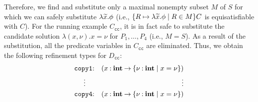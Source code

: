 Therefore, we find and substitute only a maximal nonempty subset \(M\) 
of \(S\) for which we can safely substitute \(\lambda\widetilde{x}.\phi\) (i.e., 
\(\{{R \mapsto \lambda\widetilde{x}.\phi \mid R \in M}\}C\) is equisatisfiable 
with \(C\)).
%
%
For the running example \(C_{\texttt{cc}}\), it is in fact safe to 
substitute the candidate solution \(\lambda (x,\nu). x=\nu\) for 
\(P_1,\dots,P_4\) (i.e., \(M=S\)).  As a result of the substitution, all 
the predicate variables in \(C_{\texttt{cc}}\) are eliminated.  Thus, we 
obtain the following refinement types for \(D_{\texttt{cc}}\):
\begin{eqnarray*}
\texttt{copy1}&\mathbin{:}&(x\mathbin{:}{\mathbf{int}}\mathbin{\rightarrow}{\{{\nu\mathbin{:}\mathbf{int} \mid x=\nu}\}}) \\
\vdots\quad &&\qquad\qquad \vdots \\
\texttt{copy4}&\mathbin{:}&(x\mathbin{:}{\mathbf{int}}\mathbin{\rightarrow}{\{{\nu\mathbin{:}\mathbf{int} \mid x=\nu}\}})
\end{eqnarray*}


%
